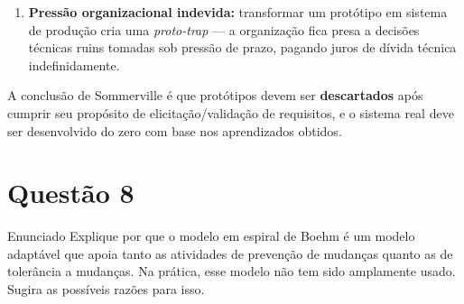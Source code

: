 \documentclass[12pt,a4paper]{article}
\begin{document}
\begin{resposta}
\begin{enumerate}
  \item \textbf{Pressão organizacional indevida:} transformar um protótipo em
        sistema de produção cria uma \textit{proto-trap} — a organização fica
        presa a decisões técnicas ruins tomadas sob pressão de prazo, pagando
        juros de dívida técnica indefinidamente.
\end{enumerate}

A conclusão de Sommerville é que protótipos devem ser \textbf{descartados} após
cumprir seu propósito de elicitação/validação de requisitos, e o sistema real
deve ser desenvolvido do zero com base nos aprendizados obtidos.

\end{resposta}

\section*{Questão 8}

\begin{questao}{Enunciado}
Explique por que o modelo em espiral de Boehm é um modelo adaptável que
apoia tanto as atividades de prevenção de mudanças quanto as de tolerância a
mudanças. Na prática, esse modelo não tem sido amplamente usado. Sugira as
possíveis razões para isso.
\end{questao}
\end{document}
